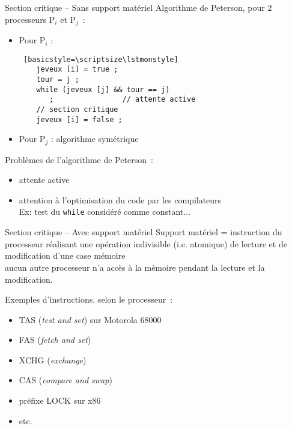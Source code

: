 \begin {frame} [fragile] {Section critique -- Sans support matériel}
    Algorithme de Peterson, pour 2 processeurs P$_i$ et P$_j$~:

    \begin {itemize}
	\item Pour P$_i$ :
    \begin {lstlisting} [basicstyle=\scriptsize\lstmonstyle]
    jeveux [i] = true ;
    tour = j ;
    while (jeveux [j] && tour == j)
       ;                // attente active
    // section critique
    jeveux [i] = false ;
    \end{lstlisting}

	\item Pour P$_j$ : algorithme symétrique
    \end {itemize}

    \vspace* {3mm}
    Problèmes de l'algorithme de Peterson~:
    \begin {itemize}
	\item attente active

	\item attention à l'optimisation du code par les compilateurs \\
	    Ex: test du \texttt {while} considéré comme constant...
    \end {itemize}

\end{frame}

\begin {frame} {Section critique -- Avec support matériel}
    Support matériel = instruction du processeur réalisant une
    opération indivisible (i.e. atomique) de lecture et de modification
    d'une case mémoire
    \\
    \implique aucun autre processeur n'a accès à la mémoire pendant
    la lecture et la modification.

    \vspace* {3mm}

    Exemples d'instructions, selon le processeur~:
    \begin {itemize}
	\item TAS (\emph {test and set}) sur Motorola 68000
	\item FAS (\emph {fetch and set})
	\item XCHG (\emph {exchange})
	\item CAS (\emph {compare and swap})
	\item préfixe LOCK sur x86
	\item etc.
    \end {itemize}

\end {frame}

